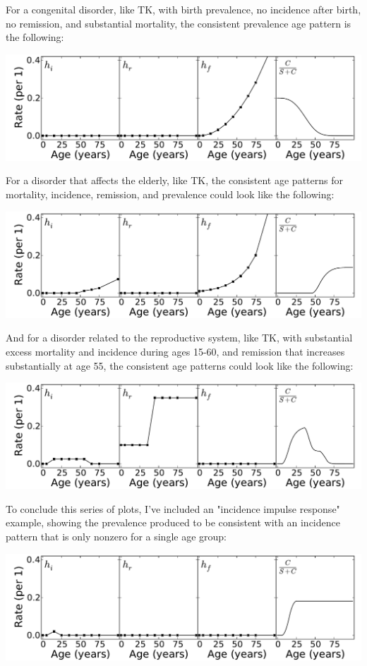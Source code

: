 For a congenital disorder, like TK, with birth prevalence, no
incidence after birth, no remission, and substantial mortality, the
consistent prevalence age pattern is the following:

\includegraphics[width=\textwidth]{forward-sim-congenital.pdf}

For a disorder that affects the elderly, like TK, the consistent age
patterns for mortality, incidence, remission, and prevalence could
look like the following: 

\includegraphics[width=\textwidth]{forward-sim-old_age.pdf}

And for a disorder related to the reproductive system, like TK, with
substantial excess mortality and incidence during ages 15-60, and
remission that increases substantially at age 55, the consistent age
patterns could look like the following: 

\includegraphics[width=\textwidth]{forward-sim-reproductive.pdf}

To conclude this series of plots, I've included an "incidence impulse
response" example, showing the prevalence produced to be consistent
with an incidence pattern that is only nonzero for a single age group:

\includegraphics[width=\textwidth]{forward-sim-incidence_pulse.pdf}

